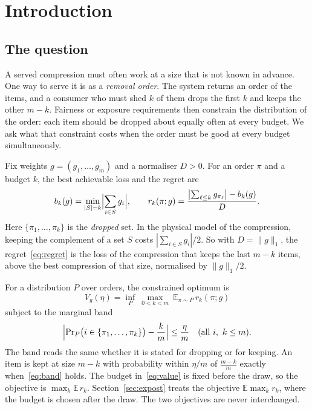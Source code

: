 \section{Introduction}
\label{sec:intro}

\subsection{The question}

A served compression must often work at a size that is not known in advance. One way to
serve it is as a \emph{removal order}. The system returns an order of the items, and a
consumer who must shed $k$ of them drops the first $k$ and keeps the other $m-k$. Fairness or
exposure requirements then constrain the distribution of the order: each item should be
dropped about equally often at every budget. We ask what that constraint costs when the order
must be good at every budget simultaneously.

Fix weights $g=(g_{1},\dots,g_{m})$ and a normaliser $D>0$. For an order $\pi$ and a budget
$k$, the best achievable loss and the regret are
\begin{equation}
b_{k}(g)=\min_{|S|=k}\Bigl|\sum_{i\in S}g_{i}\Bigr|,\qquad
r_{k}(\pi;g)=\frac{\bigl|\sum_{\ell\le k}g_{\pi_{\ell}}\bigr|-b_{k}(g)}{D}.
\label{eq:regret}
\end{equation}
Here $\{\pi_{1},\dots,\pi_{k}\}$ is the \emph{dropped} set. In the physical model of the
compression, keeping the complement of a set $S$ costs $|\sum_{i\in S}g_{i}|/2$. So with
$D=\|g\|_{1}$, the regret~\eqref{eq:regret} is the loss of the compression that keeps the
last $m-k$ items, above the best compression of that size, normalised by $\|g\|_{1}/2$.


For a distribution $P$ over orders, the constrained optimum is
\begin{equation}
V_{g}(\eta)=\inf_{P}\ \max_{0<k<m}\ \mathbb{E}_{\pi\sim P}\,r_{k}(\pi;g)
\label{eq:value}
\end{equation}
subject to the marginal band
\begin{equation}
\Bigl|\Pr\nolimits_{P}\bigl(i\in\{\pi_{1},\dots,\pi_{k}\}\bigr)-\frac{k}{m}\Bigr|\le\frac{\eta}{m}
\quad(\text{all }i,\ k\le m).
\label{eq:band}
\end{equation}
The band reads the same whether it is stated for dropping or for keeping. An item is kept at
size $m-k$ with probability within $\eta/m$ of $\frac{m-k}{m}$ exactly
when~\eqref{eq:band} holds. The budget in~\eqref{eq:value} is fixed before the draw, so the
objective is $\max_{k}\mathbb{E}\,r_{k}$. Section~\ref{sec:expost} treats the objective
$\mathbb{E}\max_{k}r_{k}$, where the budget is chosen after the draw. The two objectives are
never interchanged.

